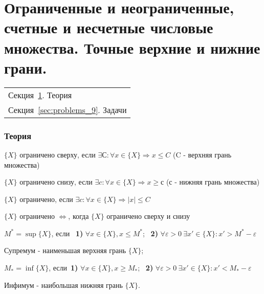 \documentclass[10pt]{article}
\begin{document}
\setcounter{footnote}{0}

\setcounter{section}{0}

\setcounter{part}{1}
	\flushbottom
	\newpage
	\pagestyle{fancynotes}
	\part[Ограниченные и неограниченные, счетные и несчетные числовые множества. Точные верхние и нижние грани.]{Ограниченные и неограниченные, счетные и несчетные числовые множества. Точные верхние и нижние грани.}
	\begin{margintable}\vspace{.8in}\footnotesize
		\begin{tabularx}{\marginparwidth}{|X}
		Секция~\ref{sec:theory_9}. Теория\\
		Секция~\ref{sec:problems_9}. Задачи\\
		\end{tabularx}
	\end{margintable}
	\section[Теория]{Теория}\label{sec:theory_9}

\begin{definition}

$ \{X\}$ ограничено сверху, если $\exists С:  \forall x \in \{X\} \Longrightarrow x \leqslant C$ (C - верхняя грань множества)

$ \{X\}$ ограничено снизу, если $\exists c:  \forall x \in \{X\} \Longrightarrow x \geqslant с$ (с - нижняя грань множества)

$ \{X\}$ ограничено, если $\exists c:  \forall x \in \{X\} \Longrightarrow |x| \leqslant C$
\end{definition}

\begin{proposition}
$ \{X\}$ ограничено $\Longleftrightarrow$, когда  $\{X\}$ ограничено сверху и снизу
\end{proposition}


\begin{definition}

$M^*\!=\sup\{X\}$, если \, \textbf{1)}  $\forall x \in \{X\}, x\leqslant  M^*$; \, \textbf{2)} $\forall \varepsilon >0 ~ \exists x' \in \{X\}: x'>M^*-\varepsilon$

Супремум - наименьшая верхняя грань $\{X\}$;

$M_*\!=\inf\{X\}$, если \,\textbf{1)} $\forall x \in \{X\}, x\geqslant  M_*$;  \, \textbf{2)} $\forall \varepsilon >0 ~ \exists x' \in \{X\}: x'<M_*-\varepsilon$

 Инфимум - наибольшая нижняя грань $\{X\}$.
\end{definition}
\end{document}
